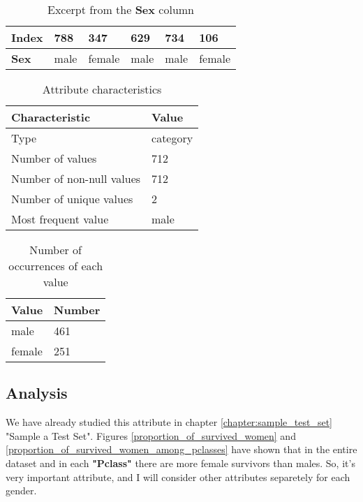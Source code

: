 \begin{table}[!hp]
    \centering
    \caption{Excerpt from the \textbf{Sex} column}
    \begin{tabular}{|l|l|l|l|l|l|}
        \hline
        \textbf{Index} & 788  & 347    & 629  & 734  & 106    \\ \hline
        \textbf{Sex}   & male & female & male & male & female \\ \hline
    \end{tabular}
    \label{table:excerpt_from_sex_column}
\end{table}

\begin{table}[!hp]
    \centering
    \caption{Attribute characteristics}
    \begin{tabular}{|l|l|}
        \hline
        \textbf{Characteristic}   & \textbf{Value} \\ \hline
        Type                      & category       \\ \hline
        Number of values          & 712            \\ \hline
        Number of non-null values & 712            \\ \hline
        Number of unique values   & 2              \\ \hline
        Most frequent value       & male           \\ \hline
    \end{tabular}
    \label{table:sex_characteristics}
\end{table}

\begin{table}[!hp]
    \centering
    \caption{Number of occurrences of each value}
    \begin{tabular}{|l|l|}
        \hline
        \textbf{Value}  & \textbf{Number} \\ \hline
        male            & 461             \\ \hline
        female          & 251             \\ \hline
    \end{tabular}
    \label{table:sex_value_counts}
\end{table}

\subsection{Analysis}
We have already studied this attribute in chapter \ref{chapter:sample_test_set}
"Sample a Test Set". Figures \ref{proportion_of_survived_women} and 
\ref{proportion_of_survived_women_among_pclasses} have shown that in the 
entire dataset and in each \textbf{"Pclass"} there are more female
survivors than males. So, it's very important attribute, and I will
consider other attributes separetely for each gender.

